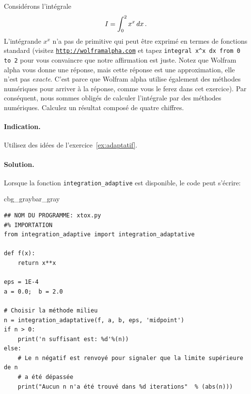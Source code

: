 \documentclass[%
oneside,                 %
final,                   %
10pt,french]{article}
\newenvironment{_pro_tight}[2]{
   \def\FrameCommand{\color{#2}\vrule width 1mm\normalcolor\colorbox{#1}}
   \FrameRule0.6pt\MakeFramed {\advance\hsize-2mm\FrameRestore}\vskip3mm}
   {\vskip0mm\endMakeFramed}
\newenvironment{pro}[2]{
\bgroup\rmfamily
\fboxsep=0mm\relax
\begin{_pro_tight}{#1}{#2}
\list{}{\parsep=-2mm\parskip=0mm\topsep=0pt\leftmargin=2mm
\rightmargin=2\leftmargin\leftmargin=4pt\relax}
\item\relax}
{\endlist\end{_pro_tight}\egroup}
\newenvironment{doconceexercise}{}{}
\newcounter{doconceexercisecounter}
\begin{document}
\begin{doconceexercise}



Considérons l'intégrale
\begin{equation*}
I = \int_0^2 x^x\,dx\thinspace .
\end{equation*}
L'intégrande $x^x$ n'a pas de primitive qui peut être exprimé en termes de fonctions standard (visitez \href{{http://wolframalpha.com}}{\nolinkurl{http://wolframalpha.com}} et tapez \Verb!integral x^x dx from 0 to 2! pour vous convaincre que notre affirmation est juste. Notez que Wolfram alpha vous donne une réponse, mais cette réponse est une approximation, elle n'est pas \emph{exacte}. C'est parce que Wolfram alpha utilise également des méthodes numériques pour arriver à la réponse, comme vous le ferez dans cet exercice). Par conséquent, nous sommes obligés de calculer l'intégrale par des méthodes numériques. Calculez un résultat composé de quatre chiffres.


\paragraph{Indication.}
Utilisez des idées de l'exercice~\ref{ex:adaptatif}.



\paragraph{Solution.}
Lorsque la fonction \Verb!integration_adaptive! est disponible, le code peut s'écrire:

\begin{pro}{cbg_gray}{bar_gray}\begin{verbatim}
## NOM DU PROGRAMME: xtox.py
#% IMPORTATION
from integration_adaptive import integration_adaptative

def f(x):
    return x**x

eps = 1E-4
a = 0.0;  b = 2.0

# Choisir la méthode milieu
n = integration_adaptative(f, a, b, eps, 'midpoint')
if n > 0:
    print('n suffisant est: %d'%(n))
else:
    # Le n négatif est renvoyé pour signaler que la limite supérieure de n 
    # a été dépassée
    print("Aucun n n'a été trouvé dans %d iterations"  % (abs(n)))
\end{verbatim}
\end{pro}
\noindent


\end{doconceexercise}
\end{document}
